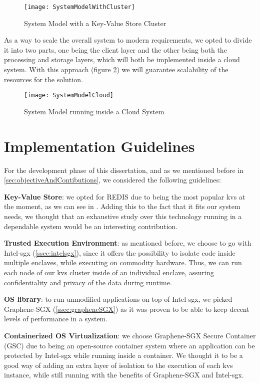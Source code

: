\begin{figure}[htbp]
	\centering
	{\texttt{[image: SystemModelWithCluster]}}
	\caption{System Model with a Key-Value Store Cluster}
	\label{fig:systemModelCluster}
\end{figure}

As a way to scale the overall system to modern requirements, we opted to divide it into two parts, one being the client layer and the other being both the processing and storage layers, which will both be implemented inside a cloud system. With this approach (figure \ref{fig:systemModelCloud}) we will guarantee scalability of the resources for the solution. 

\begin{figure}[htbp]
	\centering
	{\texttt{[image: SystemModelCloud]}}
	\caption{System Model running inside a Cloud System}
	\label{fig:systemModelCloud}
\end{figure}

\section{Implementation Guidelines} %

For the development phase of this dissertation, and as we mentioned before in \ref{sec:objectiveAndContibutions}, we considered the following guidelines:

\textbf{Key-Value Store}: we opted for REDIS due to being the most popular \gls{kvs} at the moment, as we can see in \cite{rankingKVStores}. Adding this to the fact that it fits our system needs, we thought that an exhaustive study over this technology running in a dependable system would be an interesting contribution.

\textbf{Trusted Execution Environment}: as mentioned before, we choose to go with Intel-\gls{sgx} (\ref{ssec:intelsgx}), since it offers the possibility to isolate code inside multiple enclaves, while executing on commodity hardware. Thus, we can run each node of our \gls{kvs} cluster inside of an individual enclave, assuring confidentiality and privacy of the data during runtime.

\textbf{OS library}: to run unmodified applications on top of Intel-\gls{sgx}, we picked Graphene-SGX (\ref{ssec:grapheneSGX}) as it was proven to be able to keep decent levels of performance in a system.

\textbf{Containerized OS Virtualization}: we choose Graphene-SGX Secure Container (GSC) due to being an open-source container system where an application can be protected by Intel-\gls{sgx} while running inside a container. We thought it to be a good way of adding an extra layer of isolation to the execution of each \gls{kvs} instance, while still running with the benefits of Graphene-SGX and Intel-\gls{sgx}.

